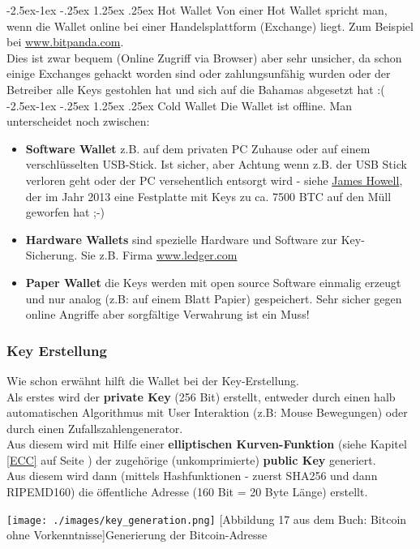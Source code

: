 \documentclass[10pt,a4paper,titlepage]{article}
\makeatletter
\renewcommand\paragraph{\@startsection{paragraph}{4}{\z@}%
            {-2.5ex\@plus -1ex \@minus -.25ex}%
            {1.25ex \@plus .25ex}%
            {\normalfont\normalsize\bfseries}}
\makeatother
\begin{document}
\paragraph{Hot Wallet}
Von einer Hot Wallet spricht man, wenn die Wallet online bei einer Handelsplattform (Exchange) liegt. Zum Beispiel bei \href{https://www.bitpanda.com}{\color{blue}www.bitpanda.com}.\\
Dies ist zwar bequem (Online Zugriff via Browser) aber sehr unsicher, da schon einige Exchanges gehackt worden sind oder zahlungsunfähig wurden oder der Betreiber alle Keys gestohlen hat und sich auf die Bahamas abgesetzt hat :(
\paragraph{Cold Wallet}
Die Wallet ist offline. Man unterscheidet noch zwischen:
\begin{itemize}
\item \textbf{Software Wallet} z.B. auf dem privaten PC Zuhause oder auf einem verschlüsselten USB-Stick. Ist sicher, aber Achtung wenn z.B. der USB Stick verloren geht oder der PC versehentlich entsorgt wird - siehe \href{https://futurezone.at/digital-life/festplatte-7500-bitcoin-muellhalde-finden-james-howells/402088129}{\color{blue}James Howell}, der im Jahr 2013 eine Festplatte mit Keys zu ca. 7500 BTC auf den Müll geworfen hat ;-)
\item \textbf{Hardware Wallets} sind spezielle Hardware und Software zur Key-Sicherung. Sie z.B. Firma \href{https://www.ledger.com/}{\color{blue}www.ledger.com}
\item \textbf{Paper Wallet} die Keys werden mit open source Software einmalig erzeugt und nur analog (z.B: auf einem Blatt Papier) gespeichert. Sehr sicher gegen online Angriffe aber sorgfältige Verwahrung ist ein Muss! 
\end{itemize}
\subsubsection{Key Erstellung}
Wie schon erwähnt hilft die Wallet bei der Key-Erstellung.\\
Als erstes wird der \textbf{private Key} (256 Bit) erstellt, entweder durch einen halb automatischen Algorithmus mit User Interaktion (z.B: Mouse Bewegungen) oder durch einen Zufallszahlengenerator. \\
Aus diesem wird mit Hilfe einer \textbf{elliptischen Kurven-Funktion} (siehe Kapitel \ref{ECC} auf Seite \pageref{ECC}) der zugehörige (unkomprimierte) \textbf{public Key} generiert.\\
Aus diesem wird dann (mittels Hashfunktionen - zuerst SHA256 und dann RIPEMD160) die öffentliche Adresse (160 Bit = 20 Byte Länge) erstellt.
\begin{center}
\texttt{[image: ./images/key\_generation.png]}
[Abbildung 17 aus dem Buch: Bitcoin ohne Vorkenntnisse]{Generierung der Bitcoin-Adresse}
\end{center}
\end{document}
